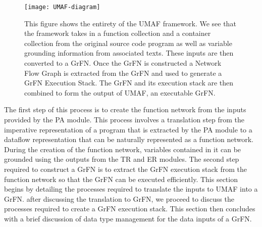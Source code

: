 \begin{figure}[!htbp]
    \centering
    \texttt{[image: UMAF-diagram]}%
    \caption[Diagram of UMAF]{This figure shows the entirety of the UMAF framework. We see that the framework takes in a function collection and a container collection from the original source code program as well as variable grounding information from associated texts. These inputs are then converted to a GrFN. Once the GrFN is constructed a Network Flow Graph is extracted from the GrFN and used to generate a GrFN Execution Stack. The GrFN and its execution stack are then combined to form the output of UMAF, an executable GrFN.}
    \label{fig:umaf_diagram}
\end{figure}

The first step of this process is to create the function network from the inputs provided by the PA module.
This process involves a translation step from the imperative representation of a program that is extracted by the PA module to a dataflow representation that can be naturally represented as a function network.
During the creation of the function network, variables contained in it can be grounded using the outputs from the TR and ER modules.
The second step required to construct a GrFN is to extract the GrFN execution stack from the function network so that the GrFN can be executed efficiently.
This section begins by detailing the processes required to translate the inputs to UMAF into a GrFN.
after discussing the translation to GrFN, we proceed to discuss the processes required to create a GrFN execution stack.
This section then concludes with a brief discussion of data type management for the data inputs of a GrFN.

